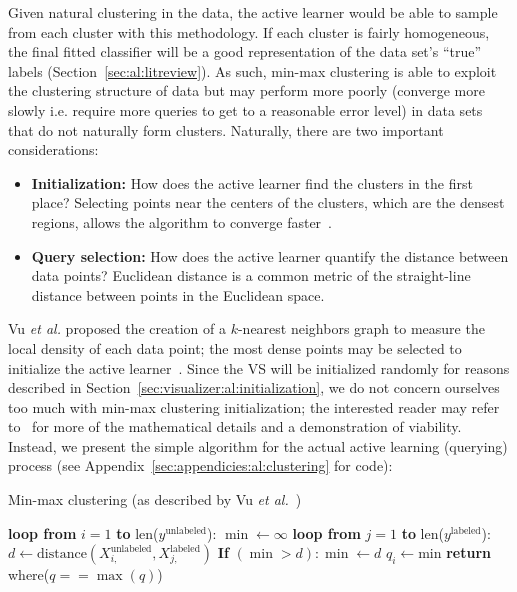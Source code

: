 Given natural clustering in the data, the active learner would be able to 
sample from each cluster with this methodology. If each cluster is fairly 
homogeneous, the final fitted classifier will be a good representation of the 
data set's ``true'' labels (Section~\ref{sec:al:litreview}). As such, min-max 
clustering is able to exploit the clustering structure of data but 
may perform more poorly (converge more slowly i.e. require more queries to get 
to a reasonable error level) in data sets that do not naturally form clusters. 
Naturally, there are two important considerations:

\tablespacing
\begin{itemize}
	\item \textbf{Initialization:} How does the active learner find the 
	clusters in the first place? Selecting points near the centers of the 
	clusters, which are the densest regions, allows the algorithm 
	to converge faster~\cite{vu2010}.
	
	\item \textbf{Query selection:} How does the active learner quantify the 
	distance between data points? Euclidean distance is a common metric of the 
	straight-line distance between points in the Euclidean space.
\end{itemize}
\bodyspacing

Vu \textit{et al.} proposed the creation of a $k$-nearest neighbors graph 
to measure the local density of each data point; the most dense points may be 
selected to initialize the active learner~\cite{vu2010}. Since the VS will be 
initialized randomly for reasons described in 
Section~\ref{sec:visualizer:al:initialization}, we do not concern ourselves too 
much with min-max clustering initialization; 
the interested reader may refer to~\cite{vu2010} for 
more of the mathematical details and a demonstration of viability. 
Instead, we present the simple algorithm for the actual active learning 
(querying) process (see Appendix~\ref{sec:appendicies:al:clustering} for code):

\tablespacing
\begin{algorithm}[H]
	\caption{Min-max clustering (as described by 
		Vu \textit{et al.}~\cite{vu2010})}\label{alg:al:methods:clustering}
	\begin{algorithmic}[1]
		\State \textbf{loop from} $i=1$ \textbf{to} len($y^{\text{unlabeled}}$):
		\State \indent $\min \gets \infty$
		\State \indent \textbf{loop from} $j=1$ \textbf{to} 
		len($y^{\text{labeled}}$):
		\State \indent \indent  $d \gets 
		\text{distance}(X_{i,}^{\text{unlabeled}},X_{j,}^{\text{labeled}})$
		\State \indent \indent \textbf{If} $(\min >d): \min \gets d$
		\State \indent $q_i \gets \text{min}$
		\State \textbf{return} where($q==\max{(q)}$)
		\EndProcedure
	\end{algorithmic}
\end{algorithm}
\bodyspacing